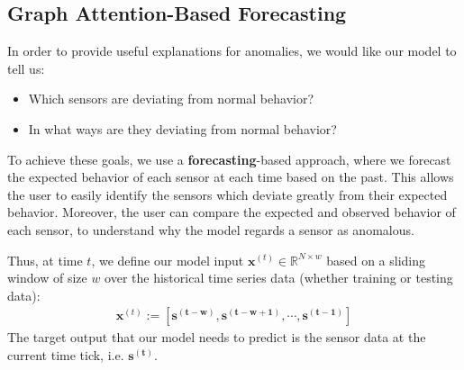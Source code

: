 \documentclass[letterpaper]{article} %
\begin{document}
\subsection{Graph Attention-Based Forecasting}

In order to provide useful explanations for anomalies, we would like our model to tell us:
\begin{itemize}
    \item Which sensors are deviating from normal behavior?
    \item In what ways are they deviating from normal behavior?
\end{itemize}

To achieve these goals, we use a \textbf{forecasting}-based approach, where we forecast the expected behavior of each sensor at each time based on the past. This allows the user to easily identify the sensors which deviate greatly from their expected behavior. Moreover, the user can compare the expected and observed behavior of each sensor, to understand why the model regards a sensor as anomalous. 

Thus, at time $t$, we define our model input $\mathbf{x}^{(t)} \in \mathbb{R}^{N \times w}$ based on a sliding window of size $w$ over the historical time series data (whether training or testing data): 
\begin{align}
    \mathbf{x}^{(t)} := \mathbf{\left[s^{(t-w)}, s^{(t-w+1)},\cdots,s^{(t-1)}\right]} 
\end{align}
The target output that our model needs to predict is the sensor data at the current time tick, i.e. $\mathbf{s^{(t)}}$.

\end{document}
